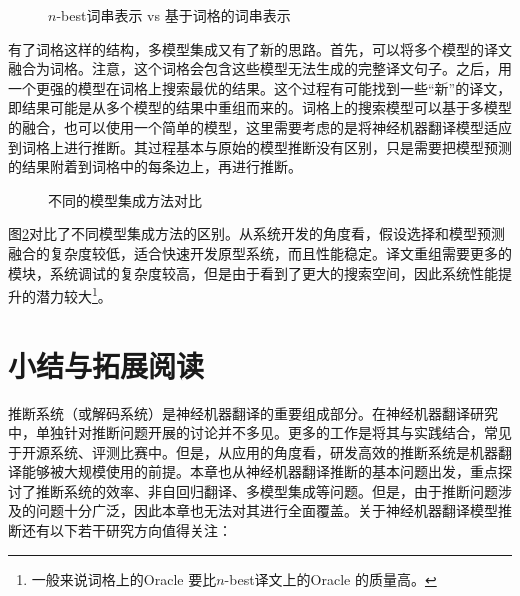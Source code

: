 \begin{figure}[htp]
\centering
 
\caption{$n$-best词串表示 vs 基于词格的词串表示}
\label{fig:14-10}
\end{figure}
\parinterval 有了词格这样的结构，多模型集成又有了新的思路。首先，可以将多个模型的译文融合为词格。注意，这个词格会包含这些模型无法生成的完整译文句子。之后，用一个更强的模型在词格上搜索最优的结果。这个过程有可能找到一些“新”的译文，即结果可能是从多个模型的结果中重组而来的。词格上的搜索模型可以基于多模型的融合，也可以使用一个简单的模型，这里需要考虑的是将神经机器翻译模型适应到词格上进行推断。其过程基本与原始的模型推断没有区别，只是需要把模型预测的结果附着到词格中的每条边上，再进行推断。

\begin{figure}[htp]
\centering
 
\caption{不同的模型集成方法对比}
\label{fig:14-11}
\end{figure}

\parinterval 图\ref{fig:14-11}对比了不同模型集成方法的区别。从系统开发的角度看，假设选择和模型预测融合的复杂度较低，适合快速开发原型系统，而且性能稳定。译文重组需要更多的模块，系统调试的复杂度较高，但是由于看到了更大的搜索空间，因此系统性能提升的潜力较大\footnote{一般来说词格上的Oracle 要比$n$-best译文上的Oracle 的质量高。}。

\sectionnewpage
\section{小结与拓展阅读}

\parinterval 推断系统（或解码系统）是神经机器翻译的重要组成部分。在神经机器翻译研究中，单独针对推断问题开展的讨论并不多见。更多的工作是将其与实践结合，常见于开源系统、评测比赛中。但是，从应用的角度看，研发高效的推断系统是机器翻译能够被大规模使用的前提。本章也从神经机器翻译推断的基本问题出发，重点探讨了推断系统的效率、非自回归翻译、多模型集成等问题。但是，由于推断问题涉及的问题十分广泛，因此本章也无法对其进行全面覆盖。关于神经机器翻译模型推断还有以下若干研究方向值得关注：

